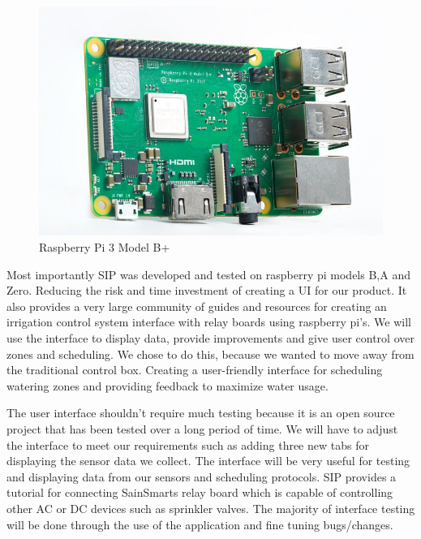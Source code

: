 \documentclass[letterpaper, 10 pt, conference]{ieeeconf}  %
\begin{document}
\begin{figure}
    \centering
    \includegraphics[scale=.3]{RaspberryPIB.jpg}
    \caption{Raspberry Pi 3 Model B+}
    \label{fig:pi_label}
\end{figure}

Most importantly SIP was developed and tested on raspberry pi models B,A and Zero. Reducing the risk and time investment of creating a UI for our product. It also provides a very large community of guides and resources for creating an irrigation control system interface with relay boards using raspberry pi's. We will use the interface to display data, provide improvements and give user control over zones and scheduling. We chose to do this, because we wanted to move away from the traditional control box. Creating a user-friendly interface for scheduling watering zones and providing feedback to maximize water usage.

The user interface shouldn't require much testing because it is an open source project that has been tested over a long period of time. We will have to adjust the interface to meet our requirements such as adding three new tabs for displaying the sensor data we collect. The interface will be very useful for testing and displaying data from our sensors and scheduling protocols. SIP provides a tutorial for connecting SainSmarts relay board which is capable of controlling other AC or DC devices such as sprinkler valves. The majority of interface testing will be done through the use of the application and fine tuning bugs/changes.
\end{document}
